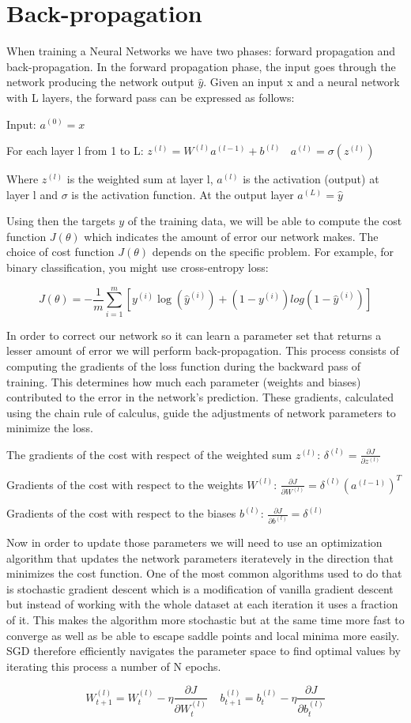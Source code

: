 \chapter{Back-propagation}

When training a Neural Networks we have two phases: forward propagation and back-propagation. In the forward propagation phase, the input goes through the network producing the network output $\hat{y}$. Given an input x and a neural network with L layers, the forward pass can be expressed as follows: 

Input: $a^{(0)} = x$

For each layer l from 1 to L: $ z^{(l)} = W^{(l)}a^{(l-1)} + b^{(l)}  ~~~~  a^{(l)} = \sigma (z^{(l)}) $

Where $z^{(l)}$ is the weighted sum at layer l, $a^{(l)}$ is the activation (output) at layer l and $\sigma$ is the activation function. At the output layer $a^{(L)} = \hat{y} $

\noindent Using then the targets $y$ of the training data, we will be able to compute the cost function $J(\theta)$ which indicates the amount of error our network makes. The choice of cost function $J(\theta)$ depends on the specific problem. For example, for binary classification, you might use cross-entropy loss:

$$J(\theta) = - \frac{1}{m} \sum_{i=1}^m \left[ y^{(i)}\log(\hat{y}^{(i)}) + (1 - y^{(i)})log(1 - \hat{y}^{(i)}) \right]$$


\noindent In order to correct our network so it can learn a parameter set that returns a lesser amount of error we will perform back-propagation. This process consists of computing the gradients of the loss function during the backward pass of training. This determines how much each parameter (weights and biases) contributed to the error in the network's prediction. These gradients, calculated using the chain rule of calculus, guide the adjustments of network parameters to minimize the loss.

The gradients of the cost with respect of the weighted sum $z^{(l)}$: $\delta^{(l)} = \frac{\partial J}{\partial z^{(l)}} $

Gradients of the cost with respect to the weights $ W^{(l)} $: $ \frac{\partial J}{\partial W^{(l)}} = \delta^{(l)}(a^{(l-1)})^{T} $

Gradients of the cost with respect to the biases $ b^{(l)} $: $ \frac{\partial J}{\partial b^{(l)}} = \delta^{(l)} $


\noindent Now in order to update those parameters we will need to use an optimization algorithm that updates the network parameters iteratevely in the direction that minimizes the cost function. One of the most common algorithms used to do that is stochastic gradient descent which is a modification of vanilla gradient descent but instead of working with the whole dataset at each iteration it uses a fraction of it. This makes the algorithm more stochastic but at the same time more fast to converge as well as be able to escape saddle points and local minima more easily. SGD therefore efficiently navigates the parameter space to find optimal values by iterating this process a number of N epochs.

$$ W^{(l)}_{t+1} = W^{(l)}_{t} - \eta \frac{\partial J}{\partial W^{(l)}_{t}} ~~~~~ b^{(l)}_{t+1} = b^{(l)}_{t} - \eta \frac{\partial J}{\partial b^{(l)}_{t}} $$


